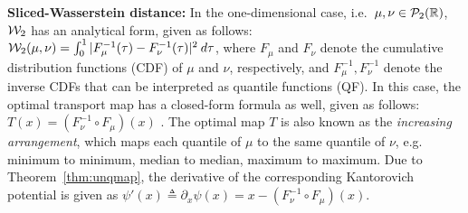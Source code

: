 





\textbf{Sliced-Wasserstein distance: }
%
In the one-dimensional case, i.e.\ $\mu,\nu \in {\cal P}_2(\mathbb{R})$, ${\cal W}_2$ has an analytical form, given as follows:
${\cal W}_2(\mu,\nu) = \int_0^1 |F_\mu^{-1}(\tau) - F_\nu^{-1}(\tau)|^2 \> d\tau$, %
where $F_\mu$ and $F_\nu$ denote the cumulative distribution functions (CDF) of $\mu$ and $\nu$, respectively, and $F^{-1}_\mu, F^{-1}_\nu$ denote the inverse CDFs that can be interpreted as quantile functions (QF).
%
In this case, the optimal transport map has a closed-form formula as well, given as follows: $T(x) = (F_\nu^{-1} \circ F_\mu) (x)$ \cite{villani2008optimal}. The optimal map $T$ is also known as the \emph{increasing arrangement}, which maps each quantile of $\mu$ to the same quantile of $\nu$, e.g. minimum to minimum, median to median, maximum to maximum.
%
Due to Theorem~\ref{thm:unqmap}, the derivative of the corresponding Kantorovich potential is given as $\psi'(x) \triangleq \partial_x \psi(x) = x- (F_\nu^{-1} \circ F_\mu) (x)$.

